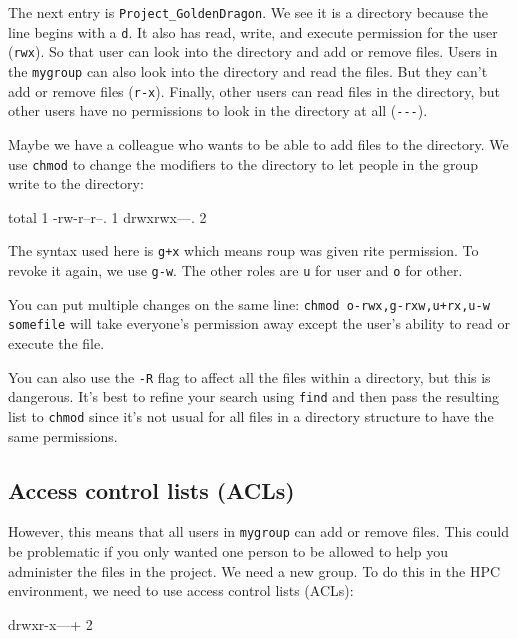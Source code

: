 The next entry is \verb|Project_GoldenDragon|. We see it is a directory because the
line begins with a \verb|d|. It also has read, write, and execute permission for
the \texttt{\userid} user (\verb|rwx|). So that user can look into the directory and add
or remove files. Users in the \verb|mygroup| can also look into the directory and
read the files. But they can't add or remove files (\verb|r-x|). Finally, other
users can read files in the directory, but other users have no permissions to
look in the directory at all (\verb|---|).

Maybe we have a colleague who wants to be able to add files to the directory. We
use \verb|chmod| to change the modifiers to the directory to let people in the
group write to the directory:

\begin{prompt}
total 1
-rw-r--r--. 1 %
drwxrwx---. 2 %
\end{prompt}

The syntax used here is \verb|g+x| which means roup was given rite
permission. To revoke it again, we use \verb|g-w|. The other roles are \verb|u| for
user and \verb|o| for other.

You can put multiple changes on the same line: \verb|chmod o-rwx,g-rxw,u+rx,u-w somefile|
will take everyone's permission away except the user's ability to
read or execute the file.

You can also use the \verb|-R| flag to affect all the files within a directory, but this
is dangerous. It's best to refine your search using \verb|find| and then pass the
resulting list to \verb|chmod| since it's not usual for all files in a directory
structure to have the same permissions.

\subsection{Access control lists (ACLs)}

However, this means that all users in \verb|mygroup| can add or remove files. This
could be problematic if you only wanted one person to be allowed to help you
administer the files in the project. We need a new group. To do this in the HPC
environment, we need to use access control lists (ACLs):

\begin{prompt}
drwxr-x---+ 2 %
\end{prompt}

